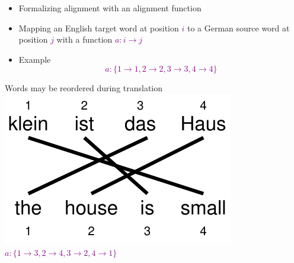 \documentclass[landscape]{slides}
\newcommand{\maths}[1]{\textcolor{purple}{#1}}
\begin{document}
\vspace{10mm}
\begin{itemize}
\item Formalizing alignment with an alignment function
\vspace{10mm}
\item Mapping an English target word at position \maths{$i$} to a German source word at position  \maths{$j$} with a function  \maths{$a: i \rightarrow j$}
\vspace{10mm}
\item Example
\maths{\begin{equation*} 
a: \{1 \rightarrow 1, 2 \rightarrow 2, 3 \rightarrow 3, 4 \rightarrow 4\}
\end{equation*}}
\end{itemize}


\begin{center}\vspace{10mm}
Words may be reordered during translation\\[10mm]
\includegraphics[scale=1.5]{haus-ist-klein-alignment-reordered.pdf}\\[10mm]
 \maths{$a: \{ 1 \rightarrow 3, 2 \rightarrow 4, 3 \rightarrow 2, 4 \rightarrow 1 \}$}
\end{center}

\end{document}
